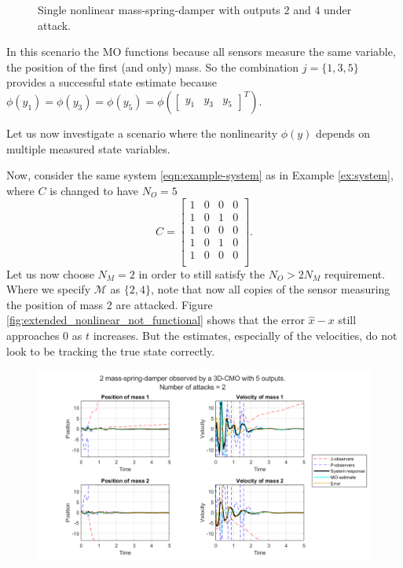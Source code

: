 \begin{example}
\begin{figure}[H]
        \caption{Single nonlinear mass-spring-damper with outputs $2$ and $4$ under attack.}
        \label{fig:single-nonlinear-functional}
    \end{figure}
    In this scenario the MO functions because all sensors measure the same variable, the position of the first (and only) mass. So the combination $j=\{1,3,5\}$ provides a successful state estimate because $\phi(y_1)=\phi(y_3)=\phi(y_5)=\phi(\begin{bmatrix}y_1&y_3&y_5\end{bmatrix}^T)$. 
\end{example}
Let us now investigate a scenario where the nonlinearity $\phi(y)$ depends on multiple measured state variables.

\begin{example}\label{ex:ext-NL-double-mass}
    Now, consider the same system \eqref{eqn:example-system} as in Example \ref{ex:system}, where $C$ is changed to have $N_O=5$
    \begin{equation*}
        C = 
        \begin{bmatrix}
            1 & 0 & 0 & 0 \\
            1 & 0 & 1 & 0 \\
            1 & 0 & 0 & 0 \\
            1 & 0 & 1 & 0 \\
            1 & 0 & 0 & 0 \\
        \end{bmatrix}.
    \end{equation*}
    Let us now choose $N_M=2$ in order to still satisfy the $N_O>2N_M$ requirement. Where we specify $\mathcal{M}$ as $\{2,4\}$, note that now all copies of the sensor measuring the position of mass 2 are attacked. Figure \ref{fig:extended_nonlinear_not_functional} shows that the error $\hat{x}-x$ still approaches $0$ as $t$ increases. But the estimates, especially of the velocities, do not look to be tracking the true state correctly.
    \begin{figure}[H]
        \centering
        \includegraphics[width=\linewidth]{report/Figures/extended_nonlinear_not_functional.png}

\end{figure}
\end{example}
